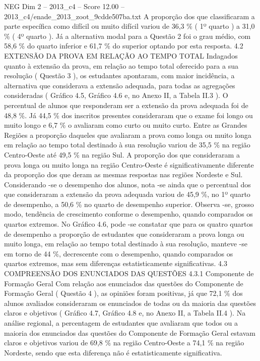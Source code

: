 \begin{textsample}{NEG Dim 2 – 2013\_c4 – Score 12.00 – 2013\_c4/enade\_2013\_zoot\_9cdde507ba.txt}
A proporção dos que classificaram a parte específica como difícil ou muito difícil variou de 36,3 \% ( 1º quarto ) a 31,0 \% ( 4º quarto ).
Já a alternativa modal para a Questão 2 foi o grau médio, com 58,6 \% do quarto inferior e 61,7 \% do superior optando por esta resposta. 4.2 EXTENSÃO DA PROVA EM RELAÇÃO AO TEMPO TOTAL Indagados quanto à extensão da prova, em relação ao tempo total oferecido para a sua resolução ( Questão 3 ), os estudantes apontaram, com maior incidência, a alternativa que considerava a extensão adequada, para todas as agregações consideradas ( Gráfico 4.5, Gráfico 4.6 e, no Anexo II, a Tabela II.3 ).
O percentual de alunos que responderam ser a extensão da prova adequada foi de 48,8 \%.
Já 44,5 \% dos inscritos presentes consideraram que o exame foi longo ou muito longo e 6,7 \% o avaliaram como curto ou muito curto.
Entre as Grandes Regiões a proporção daqueles que avaliaram a prova como longa ou muito longa em relação ao tempo total destinado à sua resolução variou de 35,5 \% na região Centro-Oeste até 49,5 \% na região Sul.
A proporção dos que consideraram a prova longa ou muito longa na região Centro-Oeste é significativamente diferente da proporção dos que deram as mesmas respostas nas regiões Nordeste e Sul.
Considerando -se o desempenho dos alunos, nota -se ainda que o percentual dos que consideraram a extensão da prova adequada variou de 45,9 \%, no 1º quarto de desempenho, a 50,6 \% no quarto de desempenho superior.
Observa -se, grosso modo, tendência de crescimento conforme o desempenho, quando comparados os quartos extremos.
No Gráfico 4.6, pode -se constatar que para os quatro quartos de desempenho a proporção de estudantes que consideraram a prova longa ou muito longa, em relação ao tempo total destinado à sua resolução, manteve -se em torno de 44 \%, decrescente com o desempenho, quando comparados os quartos extremos, mas sem diferenças estatisticamente significativas. 4.3 COMPREENSÃO DOS ENUNCIADOS DAS QUESTÕES 4.3.1 Componente de Formação Geral Com relação aos enunciados das questões do Componente de Formação Geral ( Questão 4 ), as opiniões foram positivas, já que 72,1 \% dos alunos avaliados consideraram os enunciados de todas ou da maioria das questões claros e objetivos ( Gráfico 4.7, Gráfico 4.8 e, no Anexo II, a Tabela II.4 ).
Na análise regional, a percentagem de estudantes que avaliaram que todos ou a maioria dos enunciados das questões do Componente de Formação Geral estavam claros e objetivos variou de 69,8 \% na região Centro-Oeste a 74,1 \% na região Nordeste, sendo que esta diferença não é estatisticamente significativa.

\end{textsample}
